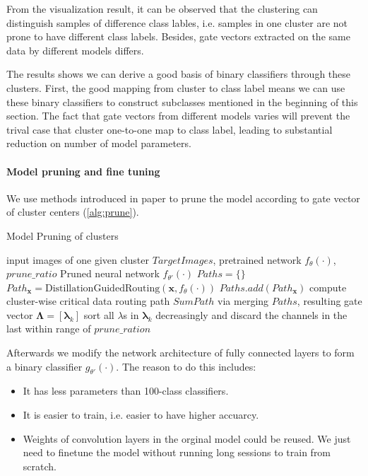 \documentclass[sigplan,10pt,review]{acmart}\settopmatter{printfolios=true,printccs=false,printacmref=false}
\begin{document}
From the visualization result, it can be observed that the clustering can distinguish samples of difference class lables, i.e. samples in one cluster are not prone to have different class labels. Besides, gate vectors extracted on the same data by different models differs.

The results shows we can derive a good basis of binary classifiers through these clusters. First, the good mapping from cluster to class label means we can use these binary classifiers to construct subclasses mentioned in the beginning of this section. The fact that gate vectors from different models varies will prevent the trival case that cluster one-to-one map to class label, leading to substantial reduction on number of model parameters.

\paragraph{Model pruning and fine tuning}

We use methods introduced in paper \cite{LiDongYue} to prune the model according to gate vector of cluster centers (\cref{alg:prune}).

\begin{algorithm}
	\caption{Model Pruning of clusters}
	\label{alg:prune}
	\begin{algorithmic}[1]
		\Require input images of one given cluster $TargetImages$, pretrained network $f_\theta(\cdot)$, $prune\_ratio$
		\Ensure Pruned neural network $f_{\theta'}(\cdot)$
		\State $Paths = \{\}$
			\State $Path_{\boldsymbol{x}} = \mathrm{DistillationGuidedRouting}(\boldsymbol{x}, f_\theta(\cdot))$
			\State $Paths.add(Path_{\boldsymbol{x}})$
		\EndFor		
		\State compute cluster-wise critical data routing path $SumPath$ via merging $Paths$, resulting gate vector $\boldsymbol{\Lambda} = [\boldsymbol{\lambda}_k]$
			\State sort all $\lambda$s in $\boldsymbol{\lambda}_k$ decreasingly and discard the channels in the last within range of $prune\_ration$
		\EndFor
	\end{algorithmic}
\end{algorithm}

Afterwards we modify the network architecture of fully connected layers to form a binary classifier $g_{\theta'}(\cdot)$. The reason to do this includes:
\begin{itemize}
	\item It has less parameters than 100-class classifiers.
	\item It is easier to train, i.e. easier to have higher accuarcy.
	\item Weights of convolution layers in the orginal model could be reused. We just need to finetune the model without running long sessions to train from scratch.
\end{itemize} 
\end{document}
